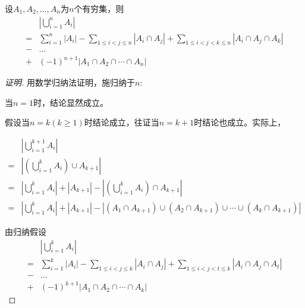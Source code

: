 \begin{Thm}
  设$A_1, A_2, \ldots, A_n$为$n$个有穷集，则
  \begin{equation*}
\begin{split}
    &|\bigcup_{i=1}^nA_i|\\
=&\sum_{i=1}^n|A_i| - \sum_{1\leq i < j \leq n}|A_i \cap A_j| + \sum_{1 \leq  i < j < k \leq n}|A_i \cap A_j \cap A_k|\\
-&\ldots\\
+&(-1)^{n+1}|A_1 \cap A_2 \cap \cdots \cap A_n| 
  \end{split}
\end{equation*}
\end{Thm}
\begin{proof}[证明]
用数学归纳法证明，施归纳于$n$:

当$n=1$时，结论显然成立。

假设当$n=k(k \geq 1)$时结论成立，往证当$n=k+1$时结论也成立。实际上，

  \begin{equation}\label{eq1}
    \begin{split}
      &|\bigcup_{i=1}^{k+1}A_i|\\
      =&|(\bigcup_{i=1}^kA_i) \cup A_{k+1}|\\
      =&|\bigcup_{i=1}^kA_i| + |A_{k+1}| - |(\bigcup_{i=1}^kA_i) \cap A_{k+1}|\\
      =&|\bigcup_{i=1}^kA_i| + |A_{k+1}| - |(A_1 \cap A_{k+1}) \cup (A_2 \cap A_{k+1}) \cup \cdots \cup (A_k \cap A_{k+1})|
    \end{split}
  \end{equation}

    由归纳假设
  \begin{equation}\label{eq2}
\begin{split}
    &|\bigcup_{i=1}^kA_i|\\
=&\sum_{i=1}^k|A_i| - \sum_{1\leq i < j \leq k}|A_i \cap A_j| + \sum_{1 \leq  i < j < t \leq k}|A_i \cap A_j \cap A_t|\\
-&\ldots\\
+&(-1)^{k+1}|A_1 \cap A_2 \cap \cdots \cap A_k| 
  \end{split}
\end{equation}


\end{proof}
